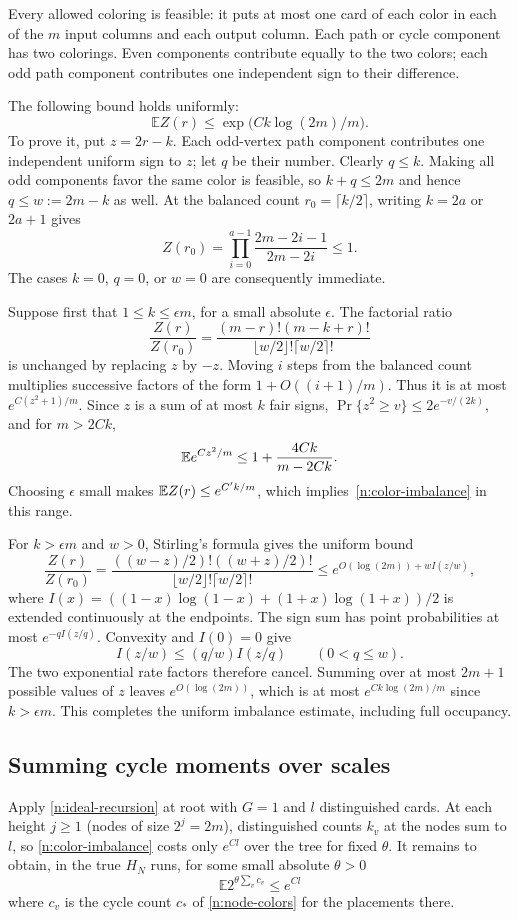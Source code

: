 Every allowed coloring is feasible: it puts at most one card of
each color in each of the $m$ input columns and each output column.
Each path or cycle component has two colorings.  Even components
contribute equally to the two colors; each odd path component
contributes one independent sign to their difference.

The following bound holds uniformly:
\begin{equation}
\mathbb E Z(r)\le \exp\big(C k\log(2m)/m\big).
\label{n:color-imbalance}
\end{equation}
To prove it, put $z=2r-k$.  Each odd-vertex path component contributes
one independent uniform sign to $z$; let $q$ be their number.  Clearly
$q\le k$.  Making all odd components favor the same color is feasible,
so $k+q\le2m$ and hence $q\le w:=2m-k$ as well.  At the balanced
count $r_0=\lceil k/2\rceil$, writing $k=2a$ or $2a+1$ gives
\[
 Z(r_0)=\prod_{i=0}^{a-1}\frac{2m-2i-1}{2m-2i}\le1.
\]
The cases $k=0$, $q=0$, or $w=0$ are consequently immediate.

Suppose first that $1\le k\le\epsilon m$, for a small absolute
$\epsilon$.  The factorial ratio
\[
 \frac{Z(r)}{Z(r_0)}
 =\frac{(m-r)!(m-k+r)!}
        {\lfloor w/2\rfloor!\lceil w/2\rceil!}
\]
is unchanged by replacing $z$ by $-z$.  Moving $i$ steps from the
balanced count multiplies successive factors of the form
$1+O((i+1)/m)$.  Thus it is at most $e^{C(z^2+1)/m}$.
Since $z$ is a sum of at most $k$ fair signs,
$\Pr\{z^2\ge v\}\le2e^{-v/(2k)}$, and for $m>2Ck$,
\[
 \mathbb E e^{Cz^2/m}
 \le1+\frac{4Ck}{m-2Ck}.
\]
Choosing $\epsilon$ small makes $\mathbb E Z(r)\le e^{C'k/m}$,
which implies~\eqref{n:color-imbalance} in this range.

For $k>\epsilon m$ and $w>0$, Stirling's formula gives the
uniform bound
\[
 \frac{Z(r)}{Z(r_0)}
 =\frac{((w-z)/2)!((w+z)/2)!}
        {\lfloor w/2\rfloor!\lceil w/2\rceil!}
 \le e^{O(\log(2m))+wI(z/w)},
\]
where
$I(x)=((1-x)\log(1-x)+(1+x)\log(1+x))/2$
is extended continuously at the endpoints.  The sign sum has point
probabilities at most $e^{-qI(z/q)}$.  Convexity and $I(0)=0$ give
\[
 I(z/w)\le(q/w)I(z/q)\qquad(0<q\le w).
\]
The two exponential rate factors therefore cancel.  Summing over
at most $2m+1$ possible values of $z$ leaves $e^{O(\log(2m))}$,
which is at most $e^{Ck\log(2m)/m}$ since $k>\epsilon m$.
This completes the uniform imbalance estimate, including full
occupancy.

\subsection{Summing cycle moments over scales}
Apply \eqref{n:ideal-recursion} at root with \(G=1\) and \(l\) distinguished cards. At each height \(j\ge1\) (nodes of size \(2^j=2m\)), distinguished counts \(k_v\) at the nodes sum to \(l\), so \eqref{n:color-imbalance} costs only \(e^{Cl}\) over the tree for fixed \(\theta\). It remains to obtain, in the true \(H_N\) runs, for some small absolute \(\theta>0\)
\begin{equation}
\mathbb E 2^{\theta\sum_v c_v}\le e^{C l}
\label{n:all-cycle-moment}
\end{equation}
where \(c_v\) is the cycle count \(c_*\) of \eqref{n:node-colors} for the placements there.

